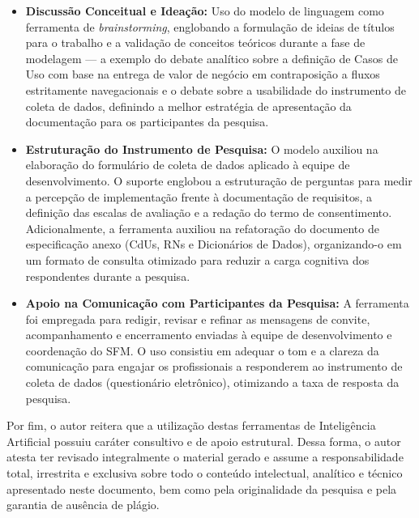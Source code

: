 \begin{itemize}[topsep=0pt, noitemsep]
    \item \textbf{Discussão Conceitual e Ideação:} Uso do modelo de linguagem como ferramenta de \textit{brainstorming}, englobando a formulação de ideias de títulos para o trabalho e a validação de conceitos teóricos durante a fase de modelagem --- a exemplo do debate analítico sobre a definição de Casos de Uso com base na entrega de valor de negócio em contraposição a fluxos estritamente navegacionais e o debate sobre a usabilidade do instrumento de coleta de dados, definindo a melhor estratégia de apresentação da documentação para os participantes da pesquisa.

    \item \textbf{Estruturação do Instrumento de Pesquisa:} O modelo auxiliou na elaboração do formulário de coleta de dados aplicado à equipe de desenvolvimento. O suporte englobou a estruturação de perguntas para medir a percepção de implementação frente à documentação de requisitos, a definição das escalas de avaliação e a redação do termo de consentimento. Adicionalmente, a ferramenta auxiliou na refatoração do documento de especificação anexo (CdUs, RNs e Dicionários de Dados), organizando-o em um formato de consulta otimizado para reduzir a carga cognitiva dos respondentes durante a pesquisa.

    \item \textbf{Apoio na Comunicação com Participantes da Pesquisa:} A ferramenta foi empregada para redigir, revisar e refinar as mensagens de convite, acompanhamento e encerramento enviadas à equipe de desenvolvimento e coordenação do SFM. O uso consistiu em adequar o tom e a clareza da comunicação para engajar os profissionais a responderem ao instrumento de coleta de dados (questionário eletrônico), otimizando a taxa de resposta da pesquisa.
\end{itemize}
    
Por fim, o autor reitera que a utilização destas ferramentas de Inteligência Artificial possuiu caráter consultivo e de apoio estrutural. Dessa forma, o autor atesta ter revisado integralmente o material gerado e assume a responsabilidade total, irrestrita e exclusiva sobre todo o conteúdo intelectual, analítico e técnico apresentado neste documento, bem como pela originalidade da pesquisa e pela garantia de ausência de plágio.